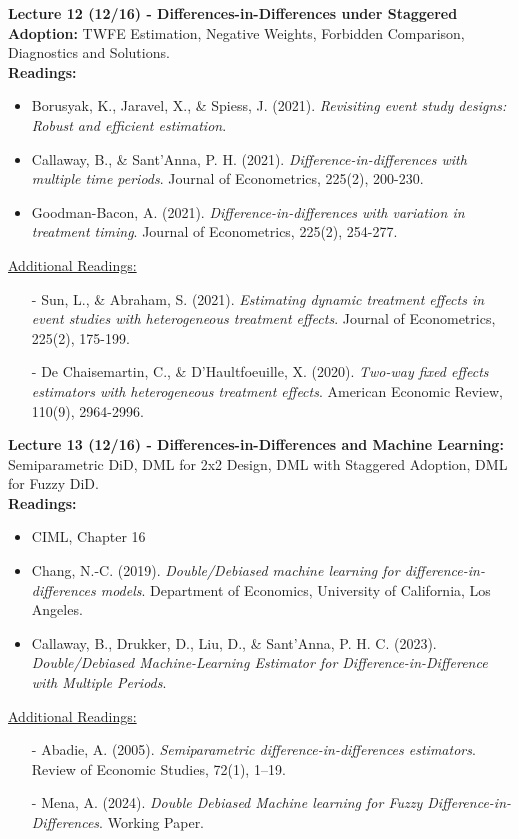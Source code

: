 \documentclass[12pt]{article}
\begin{document}
\textbf{Lecture 12 (12/16) - Differences-in-Differences under Staggered Adoption:} TWFE Estimation, Negative Weights, Forbidden Comparison, Diagnostics and Solutions.\\
\textbf{Readings:}
\begin{itemize}
    \item Borusyak, K., Jaravel, X., \& Spiess, J. (2021). \emph{Revisiting event study designs: Robust and efficient estimation}.
    \item Callaway, B., \& Sant’Anna, P. H. (2021). \emph{Difference-in-differences with multiple time periods}. Journal of Econometrics, 225(2), 200-230.
    \item Goodman-Bacon, A. (2021). \emph{Difference-in-differences with variation in treatment timing}. Journal of Econometrics, 225(2), 254-277.
\end{itemize}
\underline{Additional Readings:}
\begin{itemize}
    \item[-] Sun, L., \& Abraham, S. (2021). \emph{Estimating dynamic treatment effects in event studies with heterogeneous treatment effects}. Journal of Econometrics, 225(2), 175-199.
    \item[-] De Chaisemartin, C., \& D'Haultfoeuille, X. (2020). \emph{Two-way fixed effects estimators with heterogeneous treatment effects}. American Economic Review, 110(9), 2964-2996.
\end{itemize}

\textbf{Lecture 13 (12/16) - Differences-in-Differences and Machine Learning:} Semiparametric DiD, DML for 2x2 Design, DML with Staggered Adoption, DML for Fuzzy DiD.\\
\textbf{Readings:}
\begin{itemize}
    \item CIML, Chapter 16
    \item Chang, N.-C. (2019). \emph{Double/Debiased machine learning for difference-in-differences models}. Department of Economics, University of California, Los Angeles.
    \item Callaway, B., Drukker, D., Liu, D., \& Sant’Anna, P. H. C. (2023). \emph{Double/Debiased Machine-Learning Estimator for Difference-in-Difference with Multiple Periods}.
\end{itemize}
\underline{Additional Readings:}
\begin{itemize}
    \item[-] Abadie, A. (2005). \emph{Semiparametric difference-in-differences estimators}. Review of Economic Studies, 72(1), 1–19.
    \item[-] Mena, A. (2024). \emph{Double Debiased Machine learning for Fuzzy Difference-in-Differences}. Working Paper.
\end{itemize}
\end{document}
